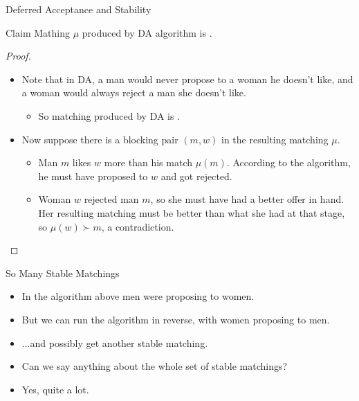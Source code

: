 \documentclass[english,10pt
,aspectratio=169
]{beamer}
\begin{document}
\begin{frame}{Deferred Acceptance and Stability}
\begin{block}{Claim}
	Mathing $\mu$ produced by DA algorithm is .
\end{block}
\begin{proof}
	\begin{itemize}
		\item Note that in DA, a man would never propose to a woman he doesn't like, and a woman would always reject a man she doesn't like.
		\begin{itemize}
			\item So matching produced by DA is .
		\end{itemize}
		\item Now suppose there is a \alert{blocking pair} $(m,w)$ in the resulting matching $\mu$.
		\begin{itemize}
			\item Man $m$ likes $w$ more than his match $\mu(m)$. According to the algorithm, he must have proposed to $w$ and got rejected.
			\item Woman $w$ rejected man $m$, so she must have had a better offer in hand. Her resulting matching must be better than what she had at that stage, so $\mu(w) \succ m$, a \alert{contradiction}. \qedhere
		\end{itemize}
	\end{itemize}
\end{proof}
\end{frame}


\begin{frame}{So Many Stable Matchings}
\begin{itemize}
	\item In the algorithm above men were proposing to women.
	\item But we can run the algorithm in reverse, with women proposing to men.
	\pause 
	\item ...and possibly get another stable matching.
	\item Can we say anything about the whole set of stable matchings?
	\item Yes, quite a lot.
\end{itemize}
\end{frame}
\end{document}
